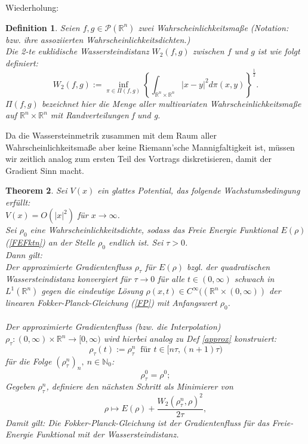 \documentclass[11pt,a4paper,notitlepage]{scrreprt}
\newcommand{\RR}{\mathbb{R}}
\newcommand{\NN}{\mathbb{N}}
\newtheorem{defi}{Definition}[section]
\newtheorem{theorem}[defi]{Theorem}
\begin{document}
Wiederholung:
\begin{defi}
Seien $f,g\in\mathcal{P}(\RR^n)$ zwei Wahrscheinlichkeitsmaße (Notation: bzw. ihre assoziierten Wahrscheinlichkeitsdichten.)\\
Die 2-te euklidische Wassersteindistanz $W_2(f,g)$ zwischen $f$ und $g$ ist wie folgt definiert:
\begin{equation}
W_2(f,g):=\inf_{\pi \in \Pi(f,g)} \left\{ \int_{\RR^n\times\RR^n} \vert x-y \vert^2 d\pi(x,y)\right\}^\frac{1}{2}.\label{W2}
\end{equation}
$\Pi(f,g)$ bezeichnet hier die Menge aller multivariaten Wahrscheinlichkeitsmaße auf $\RR^n \times \RR^n$ mit Randverteilungen f und g.
\end{defi}
Da die Wassersteinmetrik zusammen mit dem Raum aller Wahrscheinlichkeitsmaße aber keine Riemann'sche Mannigfaltigkeit ist, müssen wir zeitlich analog zum ersten Teil des Vortrags diskretisieren, damit der Gradient Sinn macht.\\


\begin{theorem}
Sei $V(x)$ ein glattes Potential, das folgende Wachstumsbedingung erfüllt: \\$V(x)=O(\vert x \vert^2)$ für $x\to\infty$. \\
Sei $\rho_0$ eine Wahrscheinlichkeitsdichte, sodass das Freie Energie Funktional $E(\rho)$ (\ref{FEFktn}) an der Stelle $\rho_0$ endlich ist. Sei $\tau>0$.\\
Dann gilt: \\
Der approximierte Gradientenfluss $\rho_\tau$  für $E(\rho)$ bzgl. der quadratischen Wassersteindistanz konvergiert für $\tau\to 0$ für alle $t\in(0,\infty)$ schwach in $L^1(\RR^n)$ gegen die eindeutige Lösung $\rho(x,t)\in C^\infty((\RR^n\times(0,\infty))$ der linearen Fokker-Planck-Gleichung (\ref{FP}) mit Anfangswert $\rho_0$.\\\\
Der approximierte Gradientenfluss (bzw. die Interpolation) $\rho_\tau:(0,\infty)\times\RR^n\to[0,\infty)$ wird hierbei analog zu Def \ref{approx} konstruiert:
\begin{equation}
\rho_\tau(t):=\rho_\tau^n ~\text{ für }t\in[n\tau,(n+1)\tau)
\end{equation}
für die Folge $(\rho_\tau^n)_n,~n\in\NN_0$:
\[\rho_\tau^0=\rho^0; \]
Gegeben $\rho_\tau^n$, definiere den nächsten Schritt als Minimierer von
\begin{equation} \rho \mapsto E(\rho)+\dfrac{W_2(\rho_\tau^n,\rho)^2}{2\tau},
\end{equation}
Damit gilt: Die Fokker-Planck-Gleichung ist der Gradientenfluss für das Freie-Energie Funktional mit der Wassersteindistanz.
\end{theorem}
\end{document}

